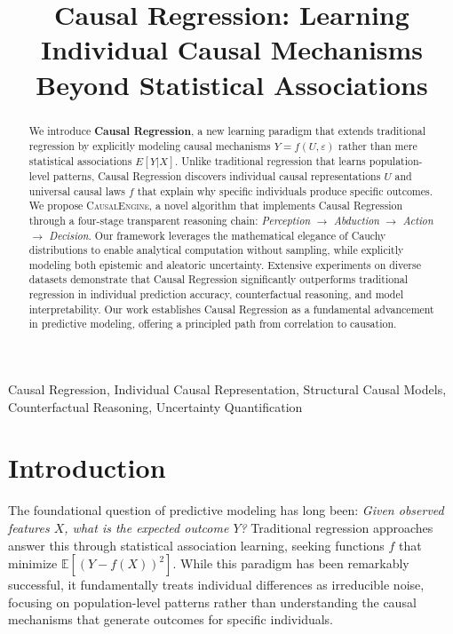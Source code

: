 \documentclass[conference]{IEEEtran}
\title{Causal Regression: Learning Individual Causal Mechanisms Beyond Statistical Associations}
\author{
\IEEEauthorblockN{Author Name}
\IEEEauthorblockA{
Department of Computer Science\\
University Name\\
Email: author@university.edu
}
\and
\IEEEauthorblockN{Coauthor Name}
\IEEEauthorblockA{
Department of Statistics\\
University Name\\
Email: coauthor@university.edu
}
}
\newcommand{\causalengine}{\textsc{CausalEngine}}
\newcommand{\expectation}{\mathbb{E}}
\begin{document}
\maketitle

\begin{abstract}
We introduce \textbf{Causal Regression}, a new learning paradigm that extends traditional regression by explicitly modeling causal mechanisms $Y = f(U, \varepsilon)$ rather than mere statistical associations $E[Y|X]$. Unlike traditional regression that learns population-level patterns, Causal Regression discovers individual causal representations $U$ and universal causal laws $f$ that explain why specific individuals produce specific outcomes. We propose \causalengine{}, a novel algorithm that implements Causal Regression through a four-stage transparent reasoning chain: \textit{Perception} $\rightarrow$ \textit{Abduction} $\rightarrow$ \textit{Action} $\rightarrow$ \textit{Decision}. Our framework leverages the mathematical elegance of Cauchy distributions to enable analytical computation without sampling, while explicitly modeling both epistemic and aleatoric uncertainty. Extensive experiments on diverse datasets demonstrate that Causal Regression significantly outperforms traditional regression in individual prediction accuracy, counterfactual reasoning, and model interpretability. Our work establishes Causal Regression as a fundamental advancement in predictive modeling, offering a principled path from correlation to causation.
\end{abstract}

\begin{IEEEkeywords}
Causal Regression, Individual Causal Representation, Structural Causal Models, Counterfactual Reasoning, Uncertainty Quantification
\end{IEEEkeywords}

\section{Introduction}
\label{sec:introduction}

The foundational question of predictive modeling has long been: \textit{Given observed features $X$, what is the expected outcome $Y$?} Traditional regression approaches answer this through statistical association learning, seeking functions $f$ that minimize $\expectation[(Y - f(X))^2]$. While this paradigm has been remarkably successful, it fundamentally treats individual differences as irreducible noise, focusing on population-level patterns rather than understanding the causal mechanisms that generate outcomes for specific individuals.
\end{document}
